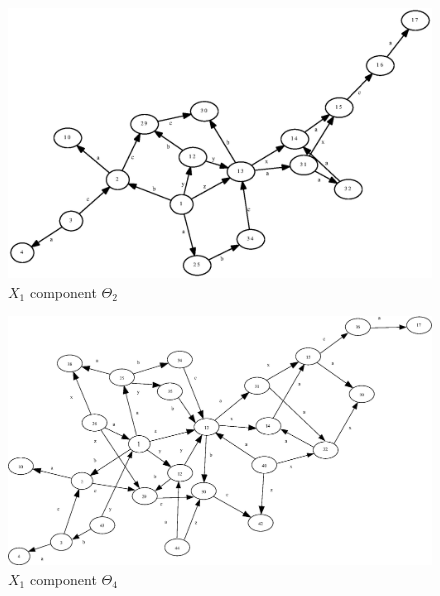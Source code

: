 \documentclass[a4paper,12pt]{article}
\numberwithin{equation}{section}
\numberwithin{figure}{section}
\begin{document}
\begin{figure}
\begin{center}
\includegraphics[scale=0.5, bb=0 0 630 410]{python/ex_K_f2.eps}
\caption{$X_1$ component $\Theta_2$}
\label{fig:K_f2}
\end{center}
\end{figure}


\begin{figure}
\begin{center}
\includegraphics[scale=0.5, bb=0 0 710 420]{python/ex_K_f4.eps}
\caption{$X_1$ component $\Theta_4$}
\label{fig:K_f4}
\end{center}
\end{figure}
\end{document}
